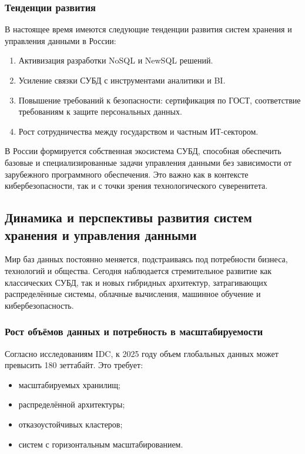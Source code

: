 \subsubsection{Тенденции развития}

В настоящее время имеются следующие тенденции развития систем хранения и управления данными в России:

\begin{enumerate}
	\item Активизация разработки NoSQL и NewSQL решений.
	\item Усиление связки СУБД с инструментами аналитики и BI.
	\item Повышение требований к безопасности: сертификация по ГОСТ, соответствие требованиям к защите персональных данных.
	\item Рост сотрудничества между государством и частным ИТ-сектором.	
\end{enumerate}

В России формируется собственная экосистема СУБД, способная обеспечить базовые и специализированные задачи управления данными без зависимости от зарубежного программного обеспечения. Это важно как в контексте кибербезопасности, так и с точки зрения технологического суверенитета.

\subsection{Динамика и перспективы развития систем хранения и управления данными}

Мир баз данных постоянно меняется, подстраиваясь под потребности бизнеса, технологий и общества. Сегодня наблюдается стремительное развитие как классических СУБД, так и новых гибридных архитектур, затрагивающих распределённые системы, облачные вычисления, машинное обучение и кибербезопасность.

\subsubsection{Рост объёмов данных и потребность в масштабируемости}

Согласно исследованиям IDC, к 2025 году объем глобальных данных может превысить 180 зеттабайт. Это требует:
\begin{itemize}
	\item масштабируемых хранилищ;
	\item распределённой архитектуры;
	\item отказоустойчивых кластеров;
	\item систем с горизонтальным масштабированием.
\end{itemize}

